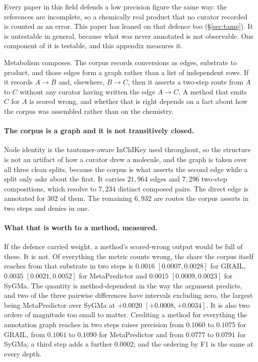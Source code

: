 \label{app:closureappendix}

Every paper in this field defends a low precision figure the same way: the references are
incomplete, so a chemically real product that no curator recorded is counted as an error. This
paper has leaned on that defence too (\S\ref{sec:tame}). It is untestable in general, because what
was never annotated is not observable. One component of it is testable, and this appendix measures
it.

Metabolism composes. The corpus records conversions as edges, substrate to product, and those edges
form a graph rather than a list of independent rows. If it records $A \to B$ and, elsewhere,
$B \to C$, then it asserts a two-step route from $A$ to $C$ without any curator having written the
edge $A \to C$. A method that emits $C$ for $A$ is scored wrong, and whether that is right depends
on a fact about how the corpus was assembled rather than on the chemistry.

\paragraph{The corpus is a graph and it is not transitively closed.} Node identity is the
tautomer-aware InChIKey used throughout, so the structure is not an artifact of how a curator drew a
molecule, and the graph is taken over all three clean splits, because the corpus is what asserts the
second edge while a split only asks about the first. It carries $21{,}964$ edges and $7{,}296$
two-step compositions, which resolve to $7{,}234$ distinct composed pairs. The direct edge is
annotated for $302$ of them. The remaining $6{,}932$ are routes the corpus asserts in two steps and
denies in one.

\paragraph{What that is worth to a method, measured.} If the defence carried weight, a method's
scored-wrong output would be full of these. It is not. Of everything the metric counts wrong, the
share the corpus itself reaches from that substrate in two steps is $0.0016$ $[0.0007,0.0028]$ for
GRAIL, $0.0035$ $[0.0021,0.0052]$ for MetaPredictor and $0.0015$ $[0.0009,0.0023]$ for SyGMa. The
quantity is method-dependent in the way the argument predicts, and two of the three pairwise
differences have intervals excluding zero, the largest being MetaPredictor over SyGMa at $+0.0020$
$[+0.0008,+0.0034]$. It is also two orders of magnitude too small to matter. Crediting a method for
everything the annotation graph reaches in two steps raises precision from $0.1060$ to $0.1075$ for
GRAIL, from $0.1061$ to $0.1090$ for MetaPredictor and from $0.0777$ to $0.0791$ for SyGMa; a third
step adds a further $0.0002$; and the ordering by F1 is the same at every depth.

